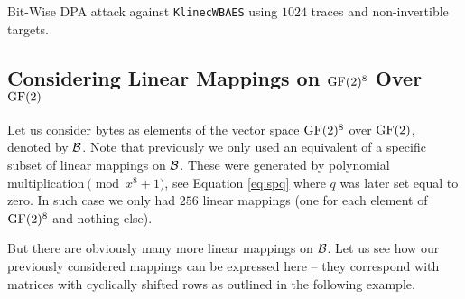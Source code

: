 \begin{landscape}
\begin{table}[H]
	\begin{center}
	
	\end{center}
\caption{Bit-Wise DPA attack against {\tt KlinecWBAES} using $1024$ traces and non-invertible targets.}
\label{tab:noninvtargets}
\end{table}
\end{landscape}



\subsection{Considering Linear Mappings on $\mathrm{GF}(2)^8$ Over $\mathrm{GF}(2)$}

Let us consider bytes as elements of the vector space $\mathrm{GF}(2)^8$ over $\mathrm{GF}(2)$, denoted by $\cal B$. Note that previously we only used an equivalent of a specific subset of linear mappings on $\cal B$. These were generated by polynomial multiplication$\pmod{x^8+1}$, see Equation \ref{eq:spq} where $q$ was later set equal to zero. In such case we only had $256$ linear mappings (one for each element of $\mathrm{GF}(2)^8$ and nothing else).

But there are obviously many more linear mappings on $\cal B$. Let us see how our previously considered mappings can be expressed here -- they correspond with matrices with cyclically shifted rows as outlined in the following example.

